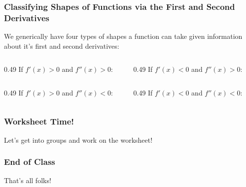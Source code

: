 \documentclass{ltx-talk}
\begin{document}
\begin{frame}
  \frametitle{Classifying Shapes of Functions via the First and Second Derivatives}

  We generically have four types of shapes a function can take
  \pause 
  given information about it's first and second derivatives: \pause

  \begin{columns}
    \begin{column}{0.49\textwidth}
      If $f'(x) > 0$ and $f''(x) > 0$: \pause
      \vfill
    \end{column} 

    \begin{column}{0.49\textwidth}
      If $f'(x) < 0$ and $f''(x) > 0$: \pause
      \vfill
    \end{column}
  \end{columns}
  \vfill

  \begin{columns}
    \begin{column}{0.49\textwidth}
      If $f'(x) > 0$ and $f''(x) < 0$: \pause
      \vfill
    \end{column}

    \begin{column}{0.49\textwidth}
      If $f'(x) < 0$ and $f''(x) < 0$: \pause
      \vfill
    \end{column}
  \end{columns}
  \vfill
\end{frame}

\begin{frame}
  \frametitle{Worksheet Time!}

  Let's get into groups and work on the worksheet!
\end{frame}

\begin{frame}
  \frametitle{End of Class}
  That's all folks!
\end{frame}
\end{document}
